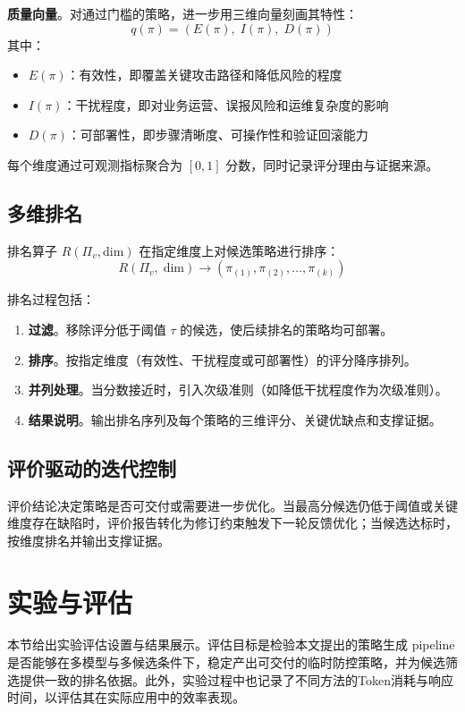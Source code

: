 	\textbf{质量向量}。对通过门槛的策略，进一步用三维向量刻画其特性：
\[
q(\pi)=(E(\pi),\; I(\pi),\; D(\pi))
\]
其中：
\begin{itemize}
    \item $E(\pi)$：有效性，即覆盖关键攻击路径和降低风险的程度
    \item $I(\pi)$：干扰程度，即对业务运营、误报风险和运维复杂度的影响
    \item $D(\pi)$：可部署性，即步骤清晰度、可操作性和验证回滚能力
\end{itemize}

每个维度通过可观测指标聚合为 $[0,1]$ 分数，同时记录评分理由与证据来源。

\subsection{多维排名}

排名算子 $R(\Pi_v, \text{dim})$ 在指定维度上对候选策略进行排序：
\[
R(\Pi_v,\;\text{dim})\rightarrow(\pi_{(1)},\pi_{(2)},\ldots,\pi_{(k)})
\]

排名过程包括：
\begin{enumerate}
    \item \textbf{过滤}。移除评分低于阈值 $\tau$ 的候选，使后续排名的策略均可部署。
    \item \textbf{排序}。按指定维度（有效性、干扰程度或可部署性）的评分降序排列。
    \item \textbf{并列处理}。当分数接近时，引入次级准则（如降低干扰程度作为次级准则）。
    \item \textbf{结果说明}。输出排名序列及每个策略的三维评分、关键优缺点和支撑证据。
\end{enumerate}

\subsection{评价驱动的迭代控制}

评价结论决定策略是否可交付或需要进一步优化。当最高分候选仍低于阈值或关键维度存在缺陷时，评价报告转化为修订约束触发下一轮反馈优化；当候选达标时，按维度排名并输出支撑证据。



\section{实验与评估}

本节给出实验评估设置与结果展示。评估目标是检验本文提出的策略生成 pipeline 是否能够在多模型与多候选条件下，稳定产出可交付的临时防控策略，并为候选筛选提供一致的排名依据。此外，实验过程中也记录了不同方法的Token消耗与响应时间，以评估其在实际应用中的效率表现。

